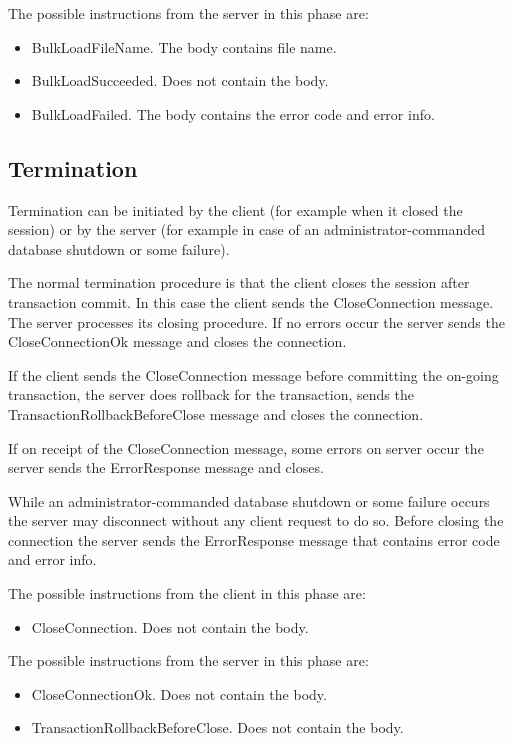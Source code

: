 \documentclass[a4paper,12pt]{article}
\begin{document}
The possible instructions from the server in this phase are:
\begin{itemize}
\item BulkLoadFileName. The body contains file name.
\item BulkLoadSucceeded. Does not contain the body.
\item BulkLoadFailed. The body contains the error code and error info.
\end{itemize}

\subsection{Termination}
Termination can be initiated by the client (for example when it closed the session) or by the server (for example in case of an administrator-commanded database shutdown or some failure). 

The normal termination procedure is that the client closes the session after transaction commit. In this case the client sends the CloseConnection message. The server processes its closing procedure. If no errors occur the server sends the CloseConnectionOk message and closes the connection.

If the client sends the CloseConnection message before committing the on-going transaction, the server does rollback for the transaction, sends the TransactionRollbackBeforeClose message and closes the connection.

If on receipt of the CloseConnection message, some errors on server occur the server sends the ErrorResponse message and closes.

While an administrator-commanded database shutdown or some failure occurs the server may disconnect without any client request to do so. Before closing the connection the server sends the ErrorResponse message that contains error code and error info. 

The possible instructions from the client in this phase are:
\begin{itemize}
\item CloseConnection. Does not contain the body. 
\end{itemize}

The possible instructions from the server in this phase are:
\begin{itemize}
\item CloseConnectionOk. Does not contain the body. 
\item TransactionRollbackBeforeClose. Does not contain the body.
\end{itemize}
\end{document}
